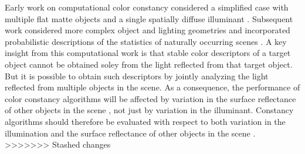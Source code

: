 \documentclass{jov}
\begin{document}
Early work on computational color constancy considered a simplified case with multiple flat matte objects and a single spatially diffuse illuminant \cite{LandRetinex,Buchsbaum80,MaloneyWandell86}.
Subsequent work considered more complex object and lighting geometries and incorporated probabilistic descriptions of the statistics of naturally occurring scenes \cite{funt1988color, D'ZmuraConstancy3, barron2012color, D'ZmuraIversonSinger,BrainardFreeman}.
A key insight from this computational work is that stable color descriptors of a target object cannot be obtained soley from the light reflected from that target object.
But it is possible to obtain such descriptors by jointly analyzing the light reflected from multiple objects in the scene.
As a consequence, the performance of color constancy algorithms will be affected by variation in the surface reflectance of other objects in the scene \cite{BrainardWandellRetinex}, not just by variation in the illuminant. Constancy algorithms should therefore be evaluated with respect to both variation in the illumination and the surface reflectance of other objects in the scene  \cite{BrainardWandellRetinex,BrainardFreeman}. 
>>>>>>> Stashed changes
\end{document}
